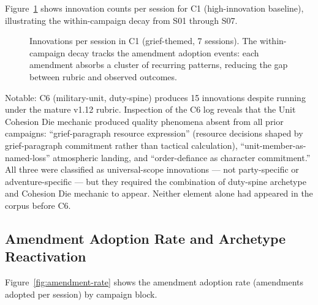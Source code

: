 Figure~\ref{fig:session-rate} shows innovation counts per session for C1
(high-innovation baseline), illustrating the within-campaign decay from
S01 through S07.

\begin{figure}[t]
  \centering
  \caption{Innovations per session in C1 (grief-themed, 7 sessions).
    The within-campaign decay tracks the amendment adoption events:
    each amendment absorbs a cluster of recurring patterns, reducing
    the gap between rubric and observed outcomes.}
  \label{fig:session-rate}
\end{figure}

Notable: C6 (military-unit, duty-spine) produces 15 innovations despite running
under the mature v1.12 rubric. Inspection of the C6 log reveals that the
Unit Cohesion Die mechanic produced quality phenomena absent from all prior
campaigns: ``grief-paragraph resource expression'' (resource decisions shaped
by grief-paragraph commitment rather than tactical calculation),
``unit-member-as-named-loss'' atmospheric landing, and ``order-defiance as
character commitment.'' All three were classified as universal-scope innovations
--- not party-specific or adventure-specific --- but they required the
combination of duty-spine archetype and Cohesion Die mechanic to appear. Neither
element alone had appeared in the corpus before C6.

\subsection{Amendment Adoption Rate and Archetype Reactivation}

Figure~\ref{fig:amendment-rate} shows the amendment adoption rate (amendments
adopted per session) by campaign block.

